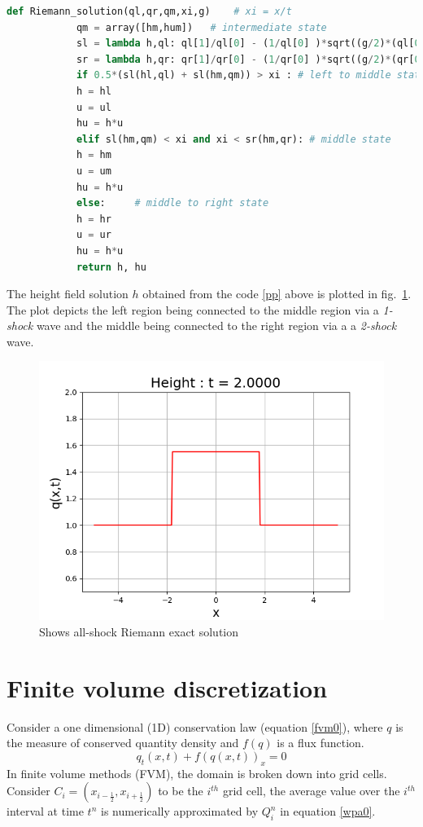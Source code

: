 \documentclass[12pt,a4paper]{article}
\begin{document}
	\begin{small}
		\begin{lstlisting}[language=Python, caption=Python code describing how the two shock case solution is obtained after the first time step.,label = pp]
			def Riemann_solution(ql,qr,qm,xi,g)    # xi = x/t
			qm = array([hm,hum])   # intermediate state
			sl = lambda h,ql: ql[1]/ql[0] - (1/ql[0] )*sqrt((g/2)*(ql[0]*h*(ql[0]+h)))
			sr = lambda h,qr: qr[1]/qr[0] - (1/qr[0] )*sqrt((g/2)*(qr[0]*h*(qr[0]+h))) 
			if 0.5*(sl(hl,ql) + sl(hm,qm)) > xi : # left to middle state
			h = hl
			u = ul
			hu = h*u   	
			elif sl(hm,qm) < xi and xi < sr(hm,qr): # middle state
			h = hm
			u = um
			hu = h*u
			else:     # middle to right state
			h = hr
			u = ur
			hu = h*u
			return h, hu
		\end{lstlisting}
	\end{small}
	
	The height field solution $h$ obtained from the code \ref{pp} above is plotted in fig.~\ref{fig:2-shock}. The plot depicts the left region being connected to the middle region via a {\em 1-shock } wave and the middle  being connected to the right region via a a {\em 2-shock } wave.
	
	\begin{figure}[H]
		\centering
		\includegraphics[width=0.5\linewidth]{images/2-shock}
		\caption{Shows all-shock Riemann exact solution }
		\label{fig:2-shock}
	\end{figure}
	
	
	\section{Finite volume discretization}
	Consider a one dimensional (1D) conservation law  (equation \eqref{fvm0}),  where $q$ is the measure of conserved quantity density and $f(q)$ is a flux function\cite{ge:2011}.
	\begin{equation}
		q_{t}(x,t) + f(q(x,t))_{x} = 0
		\label{fvm0}
	\end{equation}	
	In finite volume methods (FVM), the domain is broken down into grid cells. Consider $C_{i} = (x_{i-\frac{1}{2}},x_{i+\frac{1}{2}})$ to be the $i^{th}$ grid cell, the average value over the $i^{th}$ interval at time $t^{n}$ is numerically approximated by $Q_{i}^{n}$ in equation \eqref{wpa0}.
	
\end{document}
